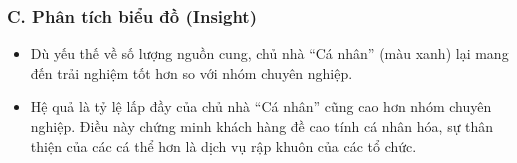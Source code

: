 \subsubsection*{C. Phân tích biểu đồ (Insight)}

\begin{itemize}
    \item Dù yếu thế về số lượng nguồn cung, chủ nhà ``Cá nhân'' (màu xanh) lại mang đến trải nghiệm tốt hơn so với nhóm chuyên nghiệp.
    \item Hệ quả là tỷ lệ lấp đầy của chủ nhà ``Cá nhân'' cũng cao hơn nhóm chuyên nghiệp. Điều này chứng minh khách hàng đề cao tính cá nhân hóa, sự thân thiện của các cá thể hơn là dịch vụ rập khuôn của các tổ chức.
\end{itemize}
